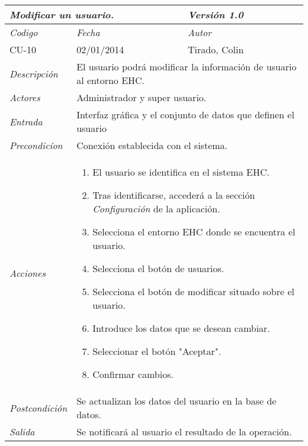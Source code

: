 \begin{center}
    \begin{tabular}{|p{3cm}|p{4cm}|p{4cm}|p{4cm}|}
    \hline \multicolumn{3}{|p{9cm}|}{\textit{Modificar un usuario.}} & \textit{Versi\'on 1.0} \\
	\hline \textit{Codigo} & \textit{Fecha} & \multicolumn{2}{|p{6cm}|}{\textit{Autor}} \\
	CU-10 & 02/01/2014 & \multicolumn{2}{|p{6cm}|}{Tirado, Colin} \\		
    \hline \textit{Descripci\'on} & \multicolumn{3}{|p{9cm}|}{El usuario podr\'a modificar la informaci\'on de usuario al entorno EHC.} \\
    \hline \textit{Actores} & \multicolumn{3}{|p{9cm}|}{Administrador y super usuario.} \\
    \hline \textit{Entrada} & \multicolumn{3}{|p{9cm}|}{Interfaz gr\'afica y el conjunto de datos que definen el usuario} \\
    \hline \textit{Precondic\'ion} & \multicolumn{3}{|p{9cm}|}{Conexi\'on establecida con el sistema.} \\
    \hline \textit{Acciones} & \multicolumn{3}{|p{9cm}|}{
        \begin{enumerate}
        \item El usuario se identifica en el sistema EHC.
        \item Tras identificarse, acceder\'a a la secci\'on \textit{Configuraci\'on} de la aplicaci\'on.
        \item Selecciona el entorno EHC donde se encuentra el usuario.
        \item Selecciona el bot\'on de usuarios.
        \item Selecciona el bot\'on de modificar situado sobre el usuario.
        \item Introduce los datos que se desean cambiar.
        \item Seleccionar el bot\'on "Aceptar".
        \item Confirmar cambios.
        \end{enumerate}
           } \\
    \hline \textit{Postcondici\'on} & \multicolumn{3}{|p{9cm}|}{Se actualizan los datos del usuario en la base de datos.} \\
    \hline \textit{Salida} & \multicolumn{3}{|p{9cm}|}{Se notificar\'a al usuario el resultado de la operaci\'on.} \\ \hline
    \end{tabular}
\end{center}